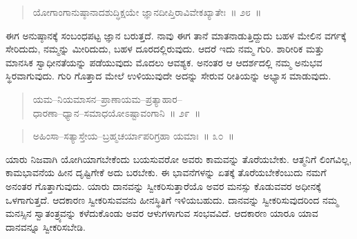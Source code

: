 \eject

\begin{verse}
ಯೋಗಾಂಗಾನುಷ್ಠಾನಾದಶುದ್ಧಿಕ್ಷಯೇ ಜ್ಞಾನದೀಪ್ತಿರಾವಿವೇಕಖ್ಯಾತೇಃ~॥ ೨೮~॥
\end{verse}

\vspace{-0.45cm}


\vspace{0.1cm}

ಈಗ ಅನುಷ್ಠಾನಕ್ಕೆ ಸಂಬಂಧಪಟ್ಟ ಜ್ಞಾನ ಬರುತ್ತದೆ. ನಾವು ಈಗ ತಾನೆ ಮಾತನಾಡುತ್ತಿದ್ದುದು ಬಹಳ ಮೇಲಿನ ವರ್ಗಕ್ಕೆ ಸೇರಿದುದು, ನಮ್ಮನ್ನು ಮೀರಿದುದು, ಬಹಳ ದೂರದಲ್ಲಿರುವುದು. ಆದರೆ ಇದು ನಮ್ಮ ಗುರಿ. ಶಾರೀರಿಕ ಮತ್ತು ಮಾನಸಿಕ ಸ್ವಾಧೀನತೆಯನ್ನು ಪಡೆಯುವುದು ಮೊದಲು ಆವಶ್ಯಕ. ಅನಂತರ ಆ ಆದರ್ಶದಲ್ಲಿ ನಮ್ಮ ಅನುಭವ ಸ್ಥಿರ\break ವಾಗುವುದು. ಗುರಿ ಗೊತ್ತಾದ ಮೇಲೆ ಉಳಿಯುವುದೇ ಅದನ್ನು ಸೇರುವ ರೀತಿಯನ್ನು ಅಭ್ಯಾಸ ಮಾಡುವುದು. 

\vspace{-0.3cm}

\begin{verse}
ಯಮ–ನಿಯಮಾಸನ–ಪ್ರಾಣಾಯಮ–ಪ್ರತ್ಯಾಹಾರ–\\ಧಾರಣಾ–ಧ್ಯಾನ–ಸಮಾಧಯೋಽಷ್ಟಾವಂಗಾನಿ~॥ ೨೯~॥
\end{verse}

\vspace{-0.4cm}


\vspace{-0.2cm}

\begin{verse}
ಅಹಿಂಸಾ–ಸತ್ಯಾಸ್ತೇಯ–ಬ್ರಹ್ಮಚರ್ಯಾಪರಿಗ್ರಹಾ ಯಮಾಃ~॥ ೩೦~॥
\end{verse}

\vspace{-0.4cm}


\vspace{0.1cm}

ಯಾರು ನಿಜವಾಗಿ ಯೋಗಿಯಾಗಬೇಕೆಂದು ಬಯಸುವರೋ ಅವರು ಕಾಮವನ್ನು ತೊರೆಯಬೇಕು. ಆತ್ಮನಿಗೆ ಲಿಂಗವಿಲ್ಲ, ಕಾಮಭಾವನೆಯ ಹೀನ ದೃಷ್ಟಿಗೇಕೆ ಅದು ಬರಬೇಕು. ಈ ಭಾವನೆಗಳನ್ನು ಏತಕ್ಕೆ ತೊರೆಯಬೇಕೆಂಬುದು ನಮಗೆ ಅನಂತರ ಗೊತ್ತಾಗುವುದು. ಯಾರು ದಾನವನ್ನು ಸ್ವೀಕರಿಸುತ್ತಾರೆಯೊ ಅವರ ಮನಸ್ಸು ಕೊಡುವವರ ಅಧೀನಕ್ಕೆ ಒಳಗಾಗುತ್ತದೆ. ಆದಕಾರಣ ಸ್ವೀಕರಿಸುವವನು ಹೀನಸ್ಥಿತಿಗೆ ಇಳಿಯಬಹುದು. ದಾನವನ್ನು ಸ್ವೀಕರಿಸುವುದರಿಂದ ನಮ್ಮ ಮನಸ್ಸಿನ ಸ್ವಾತಂತ್ರ್ಯವನ್ನು ಕಳೆದುಕೊಂಡು ಅವರ ಆಳುಗಳಾಗುವ ಸಂಭವವಿದೆ. ಆದಕಾರಣ ಯಾರೂ ಯಾವ ದಾನವನ್ನೂ ಸ್ವೀಕರಿಸಬೇಡಿ. 

